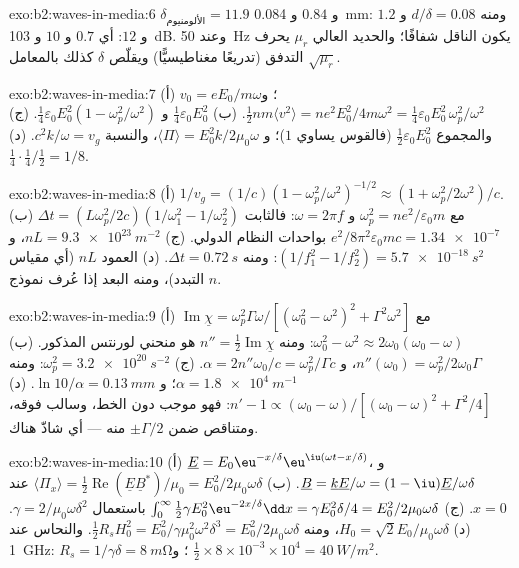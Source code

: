 \begin{solution}{exo:b2:waves-in-media:6}
$\delta_{\text{الألومنيوم}} = 11.9$ و $0.84$ و \qty{0.084}{mm}: ومنه $d/\delta = 0.08$ و $1.2$ و $12$: أي $0.7$
و $10$ و \qty{103}{dB}. وعند \qty{50}{Hz} يكون الناقل شفافًا؛ والحديد العالي
$\mu_r$ يحرف التدفق (تدريعًا مغناطيسيًّا) ويقلّص $\delta$ كذلك بالمعامل
$\sqrt{\mu_r}$.
\end{solution}

\begin{solution}{exo:b2:waves-in-media:7}
(أ) $v_0 = eE_0/m\omega$؛ و $\tfrac12nm\langle v^2\rangle = ne^2E_0^2/4m\omega^2 = \tfrac14\varepsilon_0
E_0^2\,\omega_p^2/\omega^2$. (ب) $\tfrac14\varepsilon_0E_0^2$ و $\tfrac14\varepsilon_0E_0^2(1 - \omega_p^2/
\omega^2)$. (ج) والمجموع $\tfrac12\varepsilon_0E_0^2$ (فالقوس يساوي $1$)؛ و $\langle\Pi
\rangle = E_0^2k/2\mu_0\omega$، والنسبة $c^2k/\omega = v_g$. (د) $\tfrac14\cdot\tfrac14
/\tfrac12 = 1/8$.
\end{solution}

\begin{solution}{exo:b2:waves-in-media:8}
(أ) $1/v_g = (1/c)(1 - \omega_p^2/\omega^2)^{-1/2} \approx (1 + \omega_p^2/2\omega^2)/c$. (ب) $\Delta t
= (L\omega_p^2/2c)(1/\omega_1^2 - 1/\omega_2^2)$ مع $\omega_p^2 = ne^2/\varepsilon_0m$ و $\omega =
2\pi f$: فالثابت $e^2/8\pi^2\varepsilon_0mc = \qty{1.34e-7}{}$ بواحدات النظام الدولي. (ج) $nL = \qty{9.3e23}{m^{-2}}$،
و $(1/f_1^2 - 1/f_2^2) = \qty{5.7e-18}{s^2}$: ومنه $\Delta t = \qty{0.72}{s}$. (د) العمود $nL$
(أي مقياس التبدد)، ومنه البعد إذا عُرف نموذج $n$.
\end{solution}

\begin{solution}{exo:b2:waves-in-media:9}
(أ) $\operatorname{Im}\underline\chi = \omega_p^2\Gamma\omega/[(\omega_0^2 - \omega^2)^2 + \Gamma^2\omega^2]$ مع
$\omega_0^2 - \omega^2 \approx 2\omega_0(\omega_0 - \omega)$: ومنه $n'' = \tfrac12\operatorname{Im}\underline\chi$ هو
منحني لورنتس المذكور. (ب) $n''(\omega_0) = \omega_p^2/2\omega_0\Gamma$، و $\alpha = 2n''\omega_0/c =
\omega_p^2/\Gamma c$. (ج) $\omega_p^2 = \qty{3.2e20}{s^{-2}}$: ومنه $\alpha = \qty{1.8e4}{m^{-1}}$؛ و
$\ln10/\alpha = \qty{0.13}{mm}$. (د) $n' - 1 \propto (\omega_0 - \omega)/[(\omega_0 - \omega)^2 +
\Gamma^2/4]$: فهو موجب دون الخط، وسالب فوقه، ومتناقص ضمن $\pm\Gamma/2$
منه --- أي شاذّ هناك.
\end{solution}

\begin{solution}{exo:b2:waves-in-media:10}
(أ) $\underline E = E_0\eu^{-x/\delta}\eu^{\iu(\omega t - x/\delta)}$، و $\underline B = \underline k\underline E/\omega
= (1 - \iu)\underline E/\omega\delta$. (ب) $\langle\Pi_x\rangle = \tfrac12\operatorname{Re}(\underline E
\underline B^*)/\mu_0 = E_0^2/2\mu_0\omega\delta$ عند $x = 0$. (ج) $\int_0^\infty\tfrac12\gamma E_0^2
\eu^{-2x/\delta}\dd x = \gamma E_0^2\delta/4 = E_0^2/2\mu_0\omega\delta$ باستعمال $\gamma = 2/\mu_0\omega\delta^2$.
(د) $H_0 = \sqrt2E_0/\mu_0\omega\delta$، ومنه $\tfrac12R_sH_0^2 = E_0^2/\gamma\mu_0^2\omega^2\delta^3 =
E_0^2/2\mu_0\omega\delta$. والنحاس عند \qty{1}{GHz}: $R_s = 1/\gamma\delta = \qty{8}{m\ohm}$؛
و $\tfrac12 \times 8 \times 10^{-3} \times 10^4 = \qty{40}{W/m^2}$.
\end{solution}

